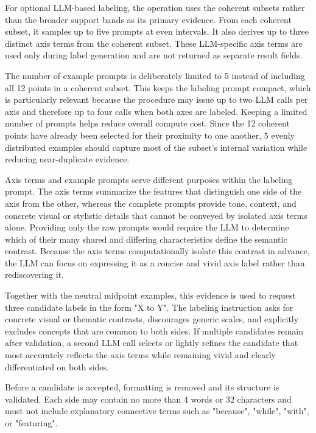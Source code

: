 For optional LLM-based labeling, the operation uses the coherent subsets rather than the broader support bands as its primary evidence. From each coherent subset, it samples up to five prompts at even intervals. It also derives up to three distinct axis terms from the coherent subset. These LLM-specific axis terms are used only during label generation and are not returned as separate result fields.

The number of example prompts is deliberately limited to 5 instead of including all 12 points in a coherent subset. This keeps the labeling prompt compact, which is particularly relevant because the procedure may issue up to two LLM calls per axis and therefore up to four calls when both axes are labeled. Keeping a limited number of prompts helps reduce overall compute cost. Since the 12 coherent points have already been selected for their proximity to one another, 5 evenly distributed examples should capture most of the subset's internal variation while reducing near-duplicate evidence.

Axis terms and example prompts serve different purposes within the labeling prompt. The axis terms summarize the features that distinguish one side of the axis from the other, whereas the complete prompts provide tone, context, and concrete visual or stylistic details that cannot be conveyed by isolated axis terms alone. Providing only the raw prompts would require the LLM to determine which of their many shared and differing characteristics define the semantic contrast. Because the axis terms computationally isolate this contrast in advance, the LLM can focus on expressing it as a concise and vivid axis label rather than rediscovering it.

Together with the neutral midpoint examples, this evidence is used to request three candidate labels in the form "X to Y". The labeling instruction asks for concrete visual or thematic contrasts, discourages generic scales, and explicitly excludes concepts that are common to both sides. If multiple candidates remain after validation, a second LLM call selects or lightly refines the candidate that most accurately reflects the axis terms while remaining vivid and clearly differentiated on both sides.

Before a candidate is accepted, formatting is removed and its structure is validated. Each side may contain no more than 4 words or 32 characters and must not include explanatory connective terms such as "because", "while", "with", or "featuring".

